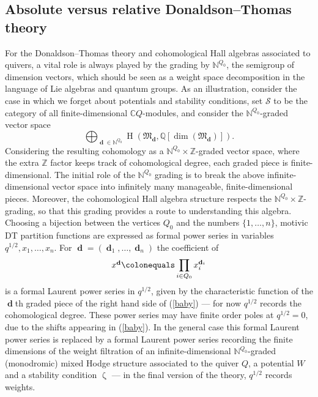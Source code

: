 \documentclass[a4paper,10pt]{amsart}
\renewcommand{\zeta}{\upzeta}
\newcommand{\NN}{\mathbb{N}}
\newcommand{\ZZ}{\mathbb{Z}}
\newcommand{\Mst}{\mathfrak{M}}
\DeclareMathOperator{\dd}{\mathbf{d}}
\DeclareMathOperator{\HO}{H}
\begin{document}
\subsection{Absolute versus relative Donaldson--Thomas theory}
\label{abvsrel}
For the Donaldson--Thomas theory and cohomological Hall algebras associated to quivers, a vital role is always played by the grading by $\mathbb{N}^{Q_0}$, the semigroup of dimension vectors, which should be seen as a weight space decomposition in the language of Lie algebras and quantum groups.  As an illustration, consider the case in which we forget about potentials and stability conditions, set $\mathcal{S}$ to be the category of all finite-dimensional $\mathbb{C}Q$-modules, and consider the $\mathbb{N}^{Q_0}$-graded vector space
\begin{equation}
\label{baby}
\bigoplus_{\dd\in\mathbb{N}^{Q_0}}\HO(\Mst_{\dd},\mathbb{Q}[\dim(\Mst_{\dd})]).
\end{equation}
Considering the resulting cohomology as a $\mathbb{N}^{Q_0}\times\mathbb{Z}$-graded vector space, where the extra $\mathbb{Z}$ factor keeps track of cohomological degree, each graded piece is finite-dimensional.  The initial role of the $\NN^{Q_0}$ grading is to break the above infinite-dimensional vector space into infinitely many manageable, finite-dimensional pieces.  Moreover, the cohomological Hall algebra structure respects the $\mathbb{N}^{Q_0}\times\ZZ$-grading, so that this grading provides a route to understanding this algebra.
\smallbreak
Choosing a bijection between the vertices $Q_0$ and the numbers $\{1,\ldots,n\}$, motivic DT partition functions are expressed as formal power series in variables $q^{1/2},x_1,\ldots,x_{n}$.  For $\dd=(\dd_1,\ldots,\dd_n)$  the coefficient of 
\[
x^{\dd}\colonequals \prod_{i\in Q_0}x_i^{\dd_i}
\]
is a formal Laurent power series in $q^{1/2}$, given by the characteristic function of the $\dd$th graded piece of the right hand side of (\ref{baby}) --- for now $q^{1/2}$ records the cohomological degree.  These power series may have finite order poles at $q^{1/2}=0$, due to the shifts appearing in (\ref{baby}).  In the general case this formal Laurent power series is replaced by a formal Laurent power series recording the finite dimensions of the weight filtration of an infinite-dimensional $\mathbb{N}^{Q_0}$-graded (monodromic) mixed Hodge structure associated to the quiver $Q$, a potential $W$ and a stability condition $\zeta$ --- in the final version of the theory, $q^{1/2}$ records weights.  
\end{document}
